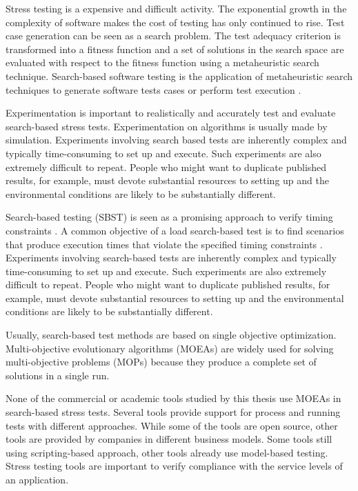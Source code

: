 \documentclass[espaco=umemeio,chapter=TITLE,twoside,openright]{abnt}
\begin{document}
Stress testing is a expensive and difficult activity. The exponential
growth in the complexity of software makes the cost of testing has only continued to rise. Test case generation can be seen as a search problem. The test adequacy criterion is transformed into a fitness function and a set of solutions in the search
space are evaluated with respect to the fitness function using a metaheuristic search technique. Search-based software testing is the application of metaheuristic search techniques to generate software
tests cases or perform test execution \cite{Afzal2009a}.

Experimentation is important to realistically and accurately test and evaluate search-based stress tests. Experimentation on algorithms is usually made by simulation. Experiments involving search based tests are inherently complex and typically time-consuming to set up and execute. Such experiments are also extremely difficult to repeat. People who might want to duplicate published results, for example, must devote substantial resources to setting up and the environmental conditions are likely to be substantially different.

Search-based testing (SBST) is seen as a promising approach to verify timing constraints \cite{Afzal2009a}. A common objective of a load search-based test is to find  scenarios that produce execution times that violate the specified timing constraints \cite{Sullivan}. Experiments involving search-based tests are inherently complex and typically time-consuming to set up and
execute. Such experiments are also extremely difficult to
repeat. People who might want to duplicate published results, for example, must devote substantial resources to setting up and the environmental conditions are likely to be substantially different.


Usually,   search-based test methods are based on single objective optimization. Multi-objective evolutionary algorithms (MOEAs) are widely used for solving multi-objective problems (MOPs) because they produce a complete set of solutions in a single run. 

None of the commercial or academic tools studied by this thesis use MOEAs in search-based stress tests. Several tools provide support for process and running tests with different approaches. While some of the tools are open source, other tools are provided by companies in different business models. Some tools still using scripting-based approach, other tools already use model-based testing.  Stress testing tools are important to verify compliance with the service levels of an application.
\end{document}
